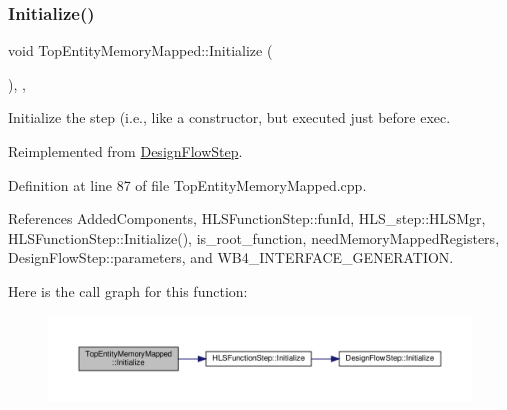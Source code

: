 \subsubsection{\texorpdfstring{Initialize()}{Initialize()}}
{\footnotesize\ttfamily void Top\+Entity\+Memory\+Mapped\+::\+Initialize (\begin{DoxyParamCaption}{ }\end{DoxyParamCaption})\hspace{0.3cm}{\ttfamily [override]}, {\ttfamily [private]}, {\ttfamily [virtual]}}



Initialize the step (i.\+e., like a constructor, but executed just before exec. 



Reimplemented from \hyperlink{classDesignFlowStep_a44b50683382a094976e1d432a7784799}{Design\+Flow\+Step}.



Definition at line 87 of file Top\+Entity\+Memory\+Mapped.\+cpp.



References Added\+Components, H\+L\+S\+Function\+Step\+::fun\+Id, H\+L\+S\+\_\+step\+::\+H\+L\+S\+Mgr, H\+L\+S\+Function\+Step\+::\+Initialize(), is\+\_\+root\+\_\+function, need\+Memory\+Mapped\+Registers, Design\+Flow\+Step\+::parameters, and W\+B4\+\_\+\+I\+N\+T\+E\+R\+F\+A\+C\+E\+\_\+\+G\+E\+N\+E\+R\+A\+T\+I\+ON.

Here is the call graph for this function\+:
\nopagebreak
\begin{figure}[H]
\begin{center}
\leavevmode
\includegraphics[width=350pt]{d1/db6/classTopEntityMemoryMapped_af010b7c4ce218de33c97dcc351aee6fd_cgraph}
\end{center}
\end{figure}
\mbox{\label{classTopEntityMemoryMapped_a3cce4e3db9f111fcb1a767dcb3ee1275}} 
